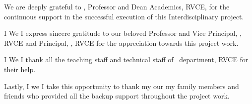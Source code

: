 \ifIDP
We are deeply grateful to \textbf{\printDA}, Professor and Dean Academics, RVCE, for the continuous support in the successful execution of this Interdisciplinary project.
\\ \par
\fi

\ifPG I \else \ifStuNameBUsed We \else I \fi\fi express sincere gratitude to our beloved Professor and Vice Principal, \textbf{\printVicePrincipal}, RVCE and Principal, \textbf{\printPrincipal}, RVCE for the appreciation towards this project work.\\ \par

\ifIDP \else\ifPG I \else\ifStuNameBUsed We \else I \fi\fi thank all the teaching staff and technical staff of \ifIDP \printGuideDeptAInLF\else\printDepartmentLF\fi\, department, RVCE for their help.\\ \par \fi

Lastly, \ifPG I \else\ifStuNameBUsed we \else I \fi\fi take this opportunity to thank \ifPG my \else\ifStuNameBUsed our \else my \fi\fi family members and friends who provided all the backup support throughout the project work.\\ \par